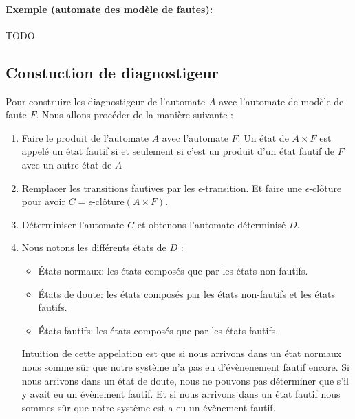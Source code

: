 \documentclass[10pt,a4paper]{article}
\begin{document}
    \paragraph{Exemple (automate des mod\`ele de fautes): }

TODO

        

    
    \subsection{Constuction de diagnostigeur}
    Pour construire les diagnostigeur de l'automate $A$ avec l'automate de mod\`ele de faute $F$. Nous allons proc\'eder de la mani\`ere suivante :
    
    \begin{enumerate}
            \item Faire le  produit de l'automate $A$ avec l'automate $F$. Un \'etat de $A\times F$ est appel\'e un \'etat fautif si et seulement si c'est un produit d'un \'etat fautif de $F$ avec un autre \'etat de $A$

            \item Remplacer les transitions fautives par les $\epsilon$-transition. Et faire une $\epsilon$-cl\^oture pour avoir $C = \epsilon$-clôture$(A\times F)$.

            \item D\'eterminiser l'automate $C$ et obtenons l'automate d\'eterminis\'e $D$.
            \item Nous notons les diff\'erents \'etats de $D$ :
                    \begin{itemize}
                            \item  \'Etats normaux: les \'etats compos\'es que par les \'etats non-fautifs.
                            \item \'Etats de doute: les \'etats compos\'es par les \'etats non-fautifs et les \'etats fautifs.
                            \item \'Etats fautifs: les \'etats compos\'es que par les \'etats fautifs. 
                    \end{itemize}  
            Intuition de cette appelation est que si nous arrivons dans un \'etat normaux nous somme s\^ur que notre syst\`eme n'a pas eu d'\'ev\`enenement fautif encore. Si nous arrivons dans un \'etat de doute, nous ne pouvons pas d\'eterminer que s'il y avait eu un \'ev\`enement fautif. Et si nous arrivons dans un \'etat fautif nous sommes s\^ur que notre syst\`eme est a eu un \'ev\`enement fautif.
    \end{enumerate} 
    
\end{document}
